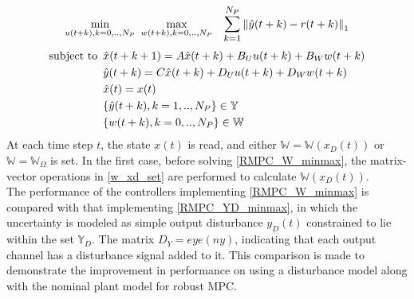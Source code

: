 \documentclass[letterpaper, 10 pt, conference]{ieeeconf}  %
\newcommand{\norm}[1]{\left\lVert#1\right\rVert}
\newcommand{\AB}[1]{\textbf{\color{magenta}{[AB: #1]}}}
\begin{document}
\begin{equation}
\small
\begin{matrix}
\begin{aligned}
\underset{u(t+k),k=0,..,N_P}{\text{min}} \hspace{5pt} \underset{w(t+k),k=0,..,N_P}{\text{max}}
&  \hspace{10pt} \mathlarger{\sum\limits_{k=1}^{N_P}}\norm{\hat y(t+k)-r(t+k)}_1 \\ \hspace{-200pt}
\end{aligned} \vspace{-10pt}\\
\begin{aligned}
\text{subject to}
& \hspace{5pt} \hat{x}(t+k+1) = A\hat{x}(t+k) + B_Uu(t+k)+B_Ww(t+k)\\
& \hspace{5pt} \hat{y}(t+k) = C\hat{x}(t+k) + D_Uu(t+k)+D_Ww(t+k) \\
& \hspace{5pt} \hat{x}(t)=x(t) \\
& \hspace{5pt} \{\hat{y}(t+k),k=1,..,N_P\} \in \mathbb{Y} \\
& \hspace{5pt} \{w(t+k),k=0,..,N_P\} \in \mathbb{W}
\end{aligned}
\end{matrix}
\label{RMPC_W_minmax}
\end{equation}
At each time step $t$, the state $x(t)$ is read, and either $\mathbb{W}=\mathbb{W}(x_D(t))$ or $\mathbb{W}=\mathbb{W}_{\Omega}$ is set. In the first case, before solving \eqref{RMPC_W_minmax}, the matrix-vector operations in \eqref{w_xd_set} are performed to calculate $\mathbb{W}(x_D(t))$. \\
The performance of the controllers implementing \eqref{RMPC_W_minmax} is compared with that implementing \eqref{RMPC_YD_minmax}, in which the uncertainty is modeled as simple output disturbance $y_D(t)$ constrained to lie within the set $\mathbb{Y}_D$. The matrix $D_Y=eye(ny)$, indicating that each output channel has a disturbance signal added to it.  This comparison is made to demonstrate the improvement in performance on using a disturbance model along with the nominal plant model for robust MPC. 
\end{document}
